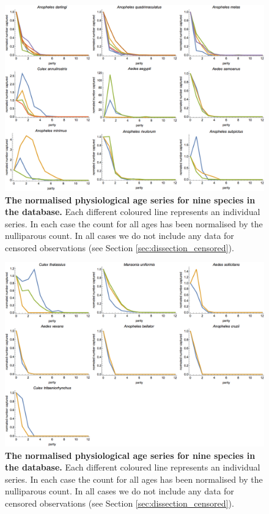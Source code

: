 \documentclass[12pt]{article}
\begin{document}
{\begin{figure}[ht]
	\centerline{\includegraphics[width=1.3\textwidth]{./Figure_files/dissection_parity_data2.png}}
	\caption{\textbf{The normalised physiological age series for nine species in the database.} Each different coloured line represents an individual series. In each case the count for all ages has been normalised by the nulliparous count. In all cases we do not include any data for censored observations (see Section \ref{sec:dissection_censored}).}\label{fig:dissection_exampleData2}
\end{figure}

\begin{figure}[ht]
	\centerline{\includegraphics[width=1.3\textwidth]{./Figure_files/dissection_parity_data3.png}}
	\caption{\textbf{The normalised physiological age series for nine species in the database.} Each different coloured line represents an individual series. In each case the count for all ages has been normalised by the nulliparous count. In all cases we do not include any data for censored observations (see Section \ref{sec:dissection_censored}).}\label{fig:dissection_exampleData3}
\end{figure}


}
\end{document}

